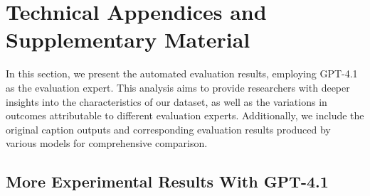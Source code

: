 \section{Technical Appendices and Supplementary Material}
In this section, we present the automated evaluation results, employing GPT-4.1 as the evaluation expert. This analysis aims to provide researchers with deeper insights into the characteristics of our dataset, as well as the variations in outcomes attributable to different evaluation experts. Additionally, we include the original caption outputs and corresponding evaluation results produced by various models for comprehensive comparison.


\subsection{More Experimental Results With GPT-4.1}\label{exp_app}

